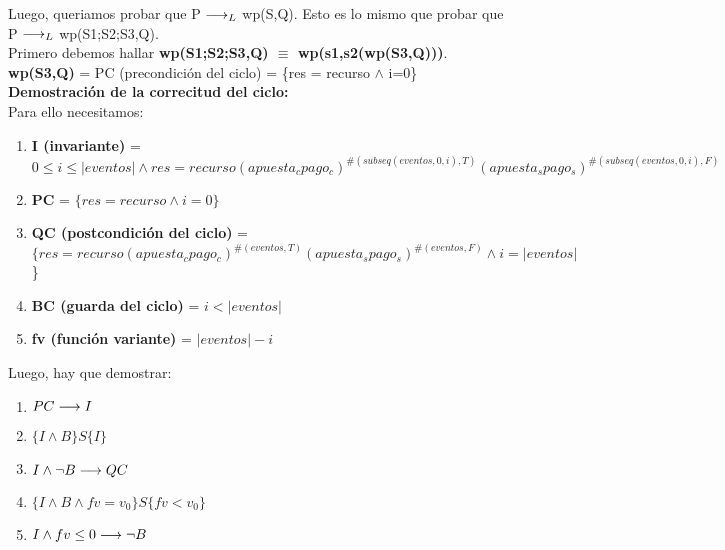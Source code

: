 \documentclass[10pt,a4paper]{article}
\begin{document}
\begin{flushleft}
\vspace{3mm}
Luego, queriamos probar que P $\longrightarrow _L$ wp(S,Q). Esto es lo mismo que probar que P $\longrightarrow _L$ wp(S1;S2;S3,Q).\\
\vspace{3mm}
Primero debemos hallar \textbf{wp(S1;S2;S3,Q) $\equiv$ wp(s1,s2(wp(S3,Q)))}.\\
\vspace{3mm}
\textbf{wp(S3,Q)} = PC (precondición del ciclo) = \{res = recurso $\wedge$ i=0\}\\
\vspace{5mm}
\textbf{Demostración de la correcitud del ciclo:}\\
\vspace{3mm}
Para ello necesitamos: 
\begin{enumerate} \setlength\itemsep{0cm}
	\item \textbf{I (invariante)} = $0\leq i \leq |eventos| \wedge res=recurso(apuesta_cpago_c)^{\#(subseq(eventos,0,i),T)}(apuesta_spago_s)^{\#(subseq(eventos,0,i),F)}$
	\item \textbf{PC} = $\{res= recurso \wedge i=0\}$
	\item \textbf{QC (postcondición del ciclo)} = $\{res=recurso(apuesta_cpago_c)^{\#(eventos,T)}(apuesta_spago_s)^{\#(eventos,F)} \wedge i=|eventos|$\}
	\item \textbf{BC (guarda del ciclo)} = $i < |eventos|$
	\item \textbf{fv (función variante)} = $|eventos|-i$
\end{enumerate}

Luego, hay que demostrar:
\begin{enumerate} \setlength\itemsep{0cm}
	\item \textbf{$PC \longrightarrow I$}
	\item \textbf{$\{ I \wedge B \}S\{ I \}$}
	\item \textbf{$I \wedge \neg B \longrightarrow QC$}
	\item \textbf{$\{ I \wedge B \wedge fv= v_0 \}S\{ fv<v_0 \}$}
	\item \textbf{$I \wedge fv\leq0 \longrightarrow \neg B$} 

\end{enumerate}


\end{flushleft}
\end{document}
